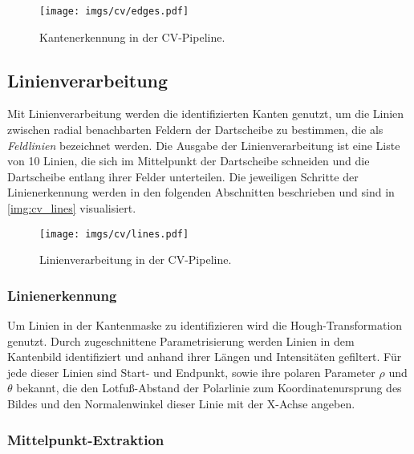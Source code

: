 \begin{figure}
    \centering
    \texttt{[image: imgs/cv/edges.pdf]}
    \caption{Kantenerkennung in der CV-Pipeline.}
    \label{img:cv_edges}
\end{figure}


\subsection{Linienverarbeitung}
\label{sec:impl:cv:lines}

Mit Linienverarbeitung werden die identifizierten Kanten genutzt, um die Linien zwischen radial benachbarten Feldern der Dartscheibe zu bestimmen, die als \textit{Feldlinien} bezeichnet werden. Die Ausgabe der Linienverarbeitung ist eine Liste von 10 Linien, die sich im Mittelpunkt der Dartscheibe schneiden und die Dartscheibe entlang ihrer Felder unterteilen. Die jeweiligen Schritte der Linienerkennung werden in den folgenden Abschnitten beschrieben und sind in \autoref{img:cv_lines} visualisiert.

\begin{figure}
    \centering
    \texttt{[image: imgs/cv/lines.pdf]}
    \caption{Linienverarbeitung in der CV-Pipeline.}
    \label{img:cv_lines}
\end{figure}

\subsubsection{Linienerkennung}
\label{sec:impl:cv:lines:erkennung}

Um Linien in der Kantenmaske zu identifizieren wird die Hough-Transformation genutzt. Durch zugeschnittene Parametrisierung werden Linien in dem Kantenbild identifiziert und anhand ihrer Längen und Intensitäten gefiltert. Für jede dieser Linien sind Start- und Endpunkt, sowie ihre polaren Parameter $\rho$ und $\theta$ bekannt, die den Lotfuß-Abstand der Polarlinie zum Koordinatenursprung des Bildes und den Normalenwinkel dieser Linie mit der X-Achse angeben.

\subsubsection{Mittelpunkt-Extraktion}
\label{sec:impl:cv:lines:midpoint}

